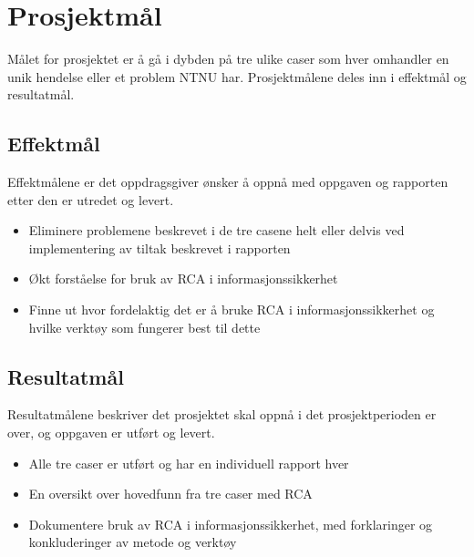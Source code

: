 \section{Prosjektmål}
\label{sec:prosjektmaal}
Målet for prosjektet er å gå i dybden på tre ulike caser som hver omhandler en unik hendelse eller et problem NTNU har. Prosjektmålene deles inn i effektmål og resultatmål.

\subsection{Effektmål}
Effektmålene er det oppdragsgiver ønsker å oppnå med oppgaven og rapporten etter den er utredet og levert.
\begin{itemize}
    \item Eliminere problemene beskrevet i de tre casene helt eller delvis ved implementering av tiltak beskrevet i rapporten
    \item Økt forståelse for bruk av RCA i informasjonssikkerhet
    \item Finne ut hvor fordelaktig det er å bruke RCA i informasjonssikkerhet og hvilke verktøy som fungerer best til dette
\end{itemize}

\subsection{Resultatmål}
Resultatmålene beskriver det prosjektet skal oppnå i det prosjektperioden er over, og oppgaven er utført og levert.

\begin{itemize}
    \item Alle tre caser er utført og har en individuell rapport hver
    \item En oversikt over hovedfunn fra tre caser med RCA
    \item Dokumentere bruk av RCA i informasjonssikkerhet, med forklaringer og konkluderinger av metode og verktøy
\end{itemize}